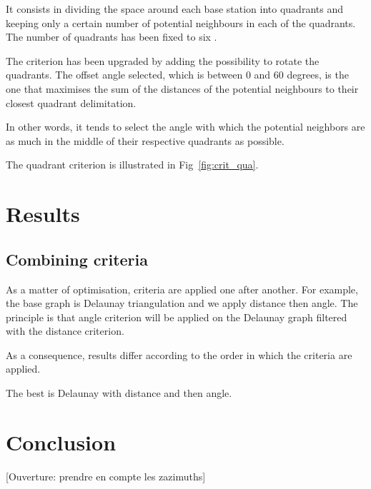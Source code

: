 \documentclass[lettersize,journal,english]{IEEEtran}
\begin{document}
It consists in dividing the space around each base station into quadrants and keeping only a certain number of potential neighbours
in each of the quadrants. The number of quadrants has been fixed to six \cite{art_del_paq}.

The criterion has been upgraded by adding the possibility to rotate the quadrants. The offset angle selected, which is between $0$ and 
$60$ degrees, is the one that maximises the sum of the distances of the potential neighbours to their closest quadrant delimitation.

In other words, it tends to select the angle with which the potential neighbors are as much in the middle of their respective quadrants
as possible.

The quadrant criterion is illustrated in Fig~\ref{fig:crit_qua}.

\section{Results}

\subsection{Combining criteria}
As a matter of optimisation, criteria are applied one after another. For example, the base graph is Delaunay triangulation and we apply distance then angle.
The principle is that angle criterion will be applied on the Delaunay graph filtered with the distance criterion.

As a consequence, results differ according to the order in which the criteria are applied.

The best is Delaunay with distance and then angle.

\section{Conclusion}

[Ouverture: prendre en compte les zazimuths]

\printglossary[type=\acronymtype]
\printglossary



\end{document}
